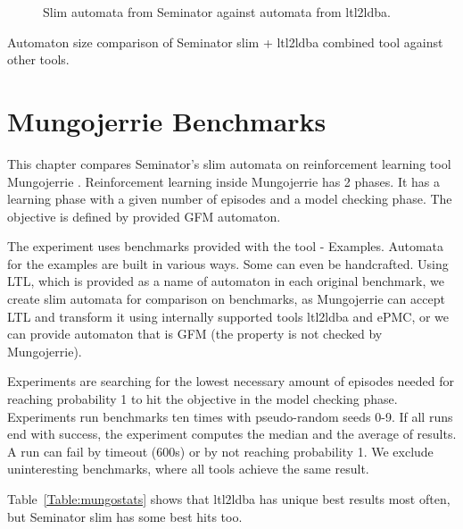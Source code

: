 \documentclass[
	digital,
nolof, nolot
]{fithesis3}
\begin{document}
		\clearpage
		\begin{figure}[ht]
			\centering
			
			\caption{Slim automata from Seminator against automata from ltl2ldba.}
			\label{scatter:seminator-ltl2ldba}
		\begin{tikzpicture}
		
		\end{tikzpicture}
		\end{figure}
	
	\begin{table}[ht]
		\centering
		
		\caption{Automaton size comparison of Seminator slim + ltl2ldba combined tool against other tools.}
		\label{table:basic-tools-mix}
		
	\end{table}

	\chapter{Mungojerrie Benchmarks}
	This chapter compares Seminator's slim automata on reinforcement learning tool Mungojerrie \cite{mungojerrie}. Reinforcement learning inside Mungojerrie has 2 phases. It has a learning phase with a given number of episodes and a model checking phase. The objective is defined by provided GFM automaton.\cite{mungojerrie}
	
	
	The experiment uses benchmarks provided with the tool - Examples. Automata for the examples are built in various ways. Some can even be handcrafted. Using LTL, which is provided as a name of automaton in each original benchmark, we create slim automata for comparison on benchmarks, as Mungojerrie can accept LTL and transform it using internally supported tools ltl2ldba and ePMC, or we can provide automaton that is GFM (the property is not checked by Mungojerrie).
	
	
	Experiments are searching for the lowest necessary amount of episodes needed for reaching probability 1 to hit the objective in the model checking phase. Experiments run benchmarks ten times with pseudo-random seeds 0-9. If all runs end with success, the experiment computes the median and the average of results. A run can fail by timeout (600s) or by not reaching probability 1. We exclude uninteresting benchmarks, where all tools achieve the same result. 
	
	Table~\ref{Table:mungostats} shows that ltl2ldba has unique best results most often, but Seminator slim has some best hits too.
	
\end{document}

